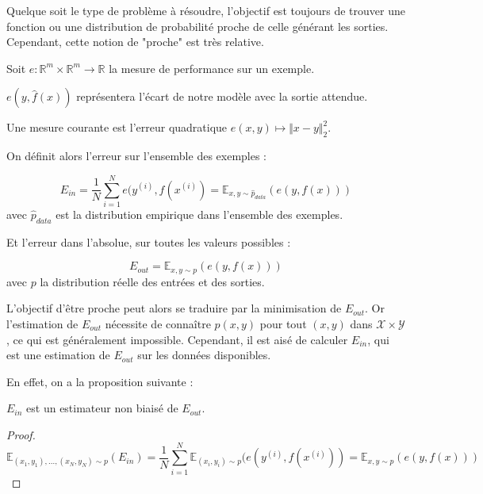 Quelque soit le type de problème à résoudre, l'objectif est toujours de trouver une fonction ou une distribution de probabilité proche de celle générant les sorties. Cependant, cette notion de "proche" est très relative. 

\begin{definition}
Soit $e : \mathbb{R}^m \times \mathbb{R}^m \rightarrow \mathbb{R}$ la mesure de performance sur un exemple.
\end{definition}
$e(y, \hat{f}(x))$ représentera l'écart de notre modèle avec la sortie attendue. 

\begin{example}
Une mesure courante est l'erreur quadratique $e(x, y) \mapsto \Vert x - y \Vert_2^2$.
\end{example}

On définit alors l'erreur sur l'ensemble des exemples :

\begin{definition}
$$
E_{in} = \frac{1}{N}\sum_{i=1}^{N}{e(y^{(i)}, f(x^{(i)})} = \mathbb{E}_{x, y \sim \hat{p}_{data}}(e(y, f(x)))
$$
avec $\hat{p}_{data}$ est la distribution empirique dans l'ensemble des exemples.
\end{definition}

Et l'erreur dans l'absolue, sur toutes les valeurs possibles :

\begin{definition}
$$
E_{out} = \mathbb{E}_{x, y \sim p}(e(y, f(x)))
$$
avec $p$ la distribution réelle des entrées et des sorties.
\end{definition}

L'objectif d'être proche peut alors se traduire par la minimisation de $E_{out}$. Or l'estimation de $E_{out}$ nécessite de connaître $p(x, y)$ pour tout $(x, y)$ dans $\mathcal{X} \times \mathcal{Y}$, ce qui est généralement impossible. Cependant, il est aisé de calculer $E_{in}$, qui est une estimation de $E_{out}$ sur les données disponibles. 

En effet, on a la proposition suivante :
\begin{proposition}
$E_{in}$ est un estimateur non biaisé de $E_{out}$.
\end{proposition}

\begin{proof}
$$
\mathbb{E}_{(x_1, y_1),..., (x_N, y_N) \sim p}(E_{in}) = \frac{1}{N}\sum_{i=1}^{N}{\mathbb{E}_{(x_i, y_i) \sim p}(e(y^{(i)}, f(x^{(i)}))} = \mathbb{E}_{x, y \sim p}(e(y, f(x)))
$$
\end{proof}

